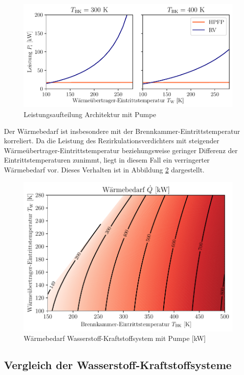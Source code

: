 \begin{figure}[ht]
\centering
\includegraphics[width=0.9\linewidth]{4_Abbildungen/2_Hauptteil/Ergebnisse/Pumpe_powersplit.pdf}
  \caption{Leistungsaufteilung Architektur mit Pumpe}
  \label{fig:pumpsplit}
\end{figure}
\FloatBarrier

Der Wärmebedarf ist insbesondere mit der Brennkammer-Eintrittstemperatur korreliert. Da die Leistung des Rezirkulationsverdichters mit steigender Wärmeübertrager-Eintrittstemperatur beziehungsweise geringer Differenz der Eintrittstemperaturen zunimmt, liegt in diesem Fall ein verringerter Wärmebedarf vor. Dieses Verhalten ist in Abbildung \ref{fig:pumpheat} dargestellt.

\begin{figure}[ht]
\centering
\includegraphics[width=0.9\linewidth]{4_Abbildungen/2_Hauptteil/Ergebnisse/Pumpeheatcontour.pdf}
  \caption{Wärmebedarf Wasserstoff-Kraftstoffsystem mit Pumpe [kW]}
  \label{fig:pumpheat}
\end{figure}
\FloatBarrier


\subsection{Vergleich der Wasserstoff-Kraftstoffsysteme}

